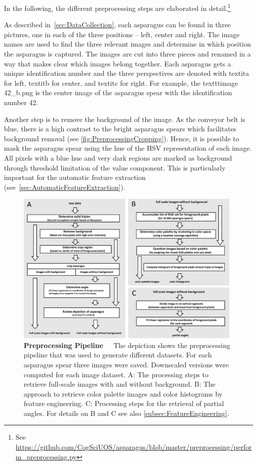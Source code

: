 In the following, the different preprocessing steps are elaborated in detail.\footnote{See \url{https://github.com/CogSciUOS/asparagus/blob/master/preprocessing/perform\_preprocessing.py}}

\bigskip
As described in~\autoref{sec:DataCollection}, each asparagus can be found in three pictures, one in each of the three positions – left, center and right. The image names are used to find the three relevant images and determine in which position the asparagus is captured. The images are cut into three pieces and renamed in a way that makes clear which images belong together. Each asparagus gets a unique identification number and the three perspectives are denoted with textit{a} for left, textit{b} for center, and textit{c} for right. For example, the texttt{image 42\_b.png} is the center image of the asparagus spear with the identification number 42. 

Another step is to remove the background of the image. As the conveyor belt is blue, there is a high contrast to the bright asparagus spears which facilitates background removal  (see \autoref{fig:PreprocessingCropping}). Hence, it is possible to mask the asparagus spear using the hue of the HSV representation of each image. All pixels with a blue hue and very dark regions are marked as background through threshold limitation of the value component. This is particularly important for the automatic feature extraction (see~\autoref{sec:AutomaticFeatureExtraction}).

\begin{figure}[!ht]
	\centering
	\includegraphics[width=0.98\textwidth]{Figures/chapter03/preprocessing_pipeline.png}
	\decoRule
	\caption[Preprocessing Pipeline]{\textbf{Preprocessing Pipeline}~~~The depiction shows the preprocessing pipeline that was used to generate different datasets. For each asparagus spear three images were saved. Downscaled versions were computed for each image dataset. A: The processing steps to retrieve full-scale images with and without background. B:  The approach to retrieve color palette images and color histograms by feature engineering. C: Processing steps for the retrieval of partial angles. For details on B and C see also \autoref{subsec:FeatureEngineering}.}
	\label{fig:PreprocessingPipeline}
\end{figure}

